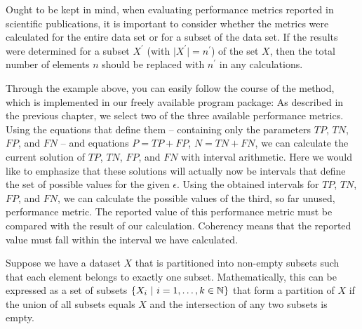 \documentclass[5p, final]{elsarticle}
\begin{document}
Ought to be kept in mind, when evaluating performance metrics reported in scientific publications, it is important to consider whether the metrics were calculated for the entire data set or for a subset of the data set. If the results were determined for a subset $X^\prime$ (with $\vert X^\prime\vert=n^\prime$) of the set $X$, then the total number of elements $n$ should be replaced with $n^\prime$ in any calculations.

Through the example above, you can easily follow the course of the method, which is implemented in our freely available program package: As described in the previous chapter, we select two of the three available performance metrics. Using the equations that define them -- containing only the parameters $TP$, $TN$, $FP$, and $FN$ -- and equations $P=TP+FP$, $N=TN+FN$, we can calculate the current solution of $TP$, $TN$, $FP$, and $FN$ with interval arithmetic. Here we would like to emphasize that these solutions will actually now be intervals that define the set of possible values for the given $\epsilon$. Using the obtained intervals for $TP$, $TN$, $FP$, and $FN$, we can calculate the possible values of the third, so far unused, performance metric. The reported value of this performance metric must be compared with the result of our calculation. Coherency means that the reported value must fall within the interval we have calculated.




Suppose we have a dataset $X$ that is partitioned into non-empty subsets such that each element belongs to exactly one subset. Mathematically, this can be expressed as a set of subsets $\{X_i\hbox{\space} \vert\hbox{\space} i=1,\dots,k\in\Bbb{N}\}$ that form a partition of $X$ if the union of all subsets equals $X$ and the intersection of any two subsets is empty.
\end{document}
